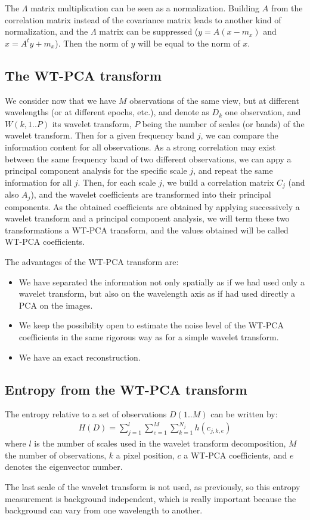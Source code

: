 The $\Lambda$ matrix multiplication can be seen as a normalization.
Building $A$ from the correlation matrix instead of the covariance matrix
leads to another kind of normalization, 
and the $\Lambda$ matrix can be suppressed 
($y = A(x-m_x)$ and $x = A^t y + m_x$). Then the norm of $y$ will be equal to the
norm of $x$.  

\subsection{The WT-PCA transform}

We consider now that we have $M$ observations of the same view, but
at different wavelengths (or at different epochs, etc.), and denote 
as $D_k$ one 
observation, and $W(k, 1..P)$ its wavelet transform, $P$ being the
number of scales (or bands) of the wavelet transform. Then for a given
frequency band $j$, we can compare the information content for all observations.
As a strong correlation may exist between the same frequency band of two 
different observations, we can appy a principal component analysis for
the specific scale $j$, and repeat the same information for all $j$. Then,
for each scale $j$, we build a correlation matrix $C_j$ (and also $A_j$), 
and the wavelet coefficients are transformed into their principal 
components. As the obtained coefficients are obtained by applying
successively a wavelet transform and a principal component analysis,
we will term these two transformations a WT-PCA transform,
and the values obtained will be called WT-PCA coefficients.

The advantages of the WT-PCA transform are:
\begin{itemize}
\item We have separated the information not only spatially as if we had
used only a wavelet transform, but also on the wavelength axis as if
had used directly a PCA on the images.
\item We keep the possibility open to estimate the noise level of the  
WT-PCA coefficients in  the same rigorous way as for a simple wavelet 
transform.
\item We have an exact reconstruction.
\end{itemize}
 
\subsection{Entropy from the WT-PCA transform}

The entropy relative to a set of observations $D(1..M)$ can be written by:
\begin{eqnarray}
H(D) = \sum_{j=1}^{l} \sum_{e=1}^{M}  \sum_{k=1}^{N_j} h(c_{j,k,e})
\end{eqnarray}
where $l$ is the number of scales used in the wavelet transform
decomposition, $M$ the number of observations, $k$ a pixel position,
 $c$ a WT-PCA coefficients, and $e$ denotes the eigenvector number.

The last scale of the wavelet transform is not used, as previously, so
this entropy measurement is background independent, which is really
important because the background can vary from one wavelength to another.


